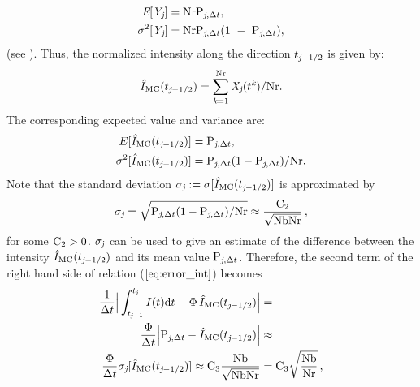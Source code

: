 \begin{subequations}
\begin{align}
\textit{E}[\textit{Y}_{\textit{j}}] &= \textrm{Nr}\textrm{P}_{\textit{j}, \Delta t}, \\ \sigma^2[\textit{Y}_{\textit{j}}] &= \textrm{Nr}\textrm{P}_{\textit{j}, \Delta t}(1~-~\textrm{P}_{\textit{j}, \Delta t}),\end{align}
\end{subequations}
(see \cite{zolotarev1997modern, rubinstein2016simulation}).
Thus, the normalized intensity along the direction $t_{\textit{j}-1/2}$ is given by:
\begin{equation}\hat{I}_{\textrm{MC}}(t_{\textit{j}-1/2}) = \sum_{\textit{k}=1}^{\textrm{Nr}}\textit{X}_{\textit{j}}(t^{\textit{k}})/\textrm{Nr}.\end{equation}
The corresponding expected value and variance are:
\begin{subequations}
\begin{align}E[\hat{I}_{\textrm{MC}}(t_{\textit{j}-1/2})]&=\textrm{P}_{\textit{j}, \Delta t},\\ \label{eq:variance_I}
\sigma^2[\hat{I}_{\textrm{MC}}(t_{\textit{j}-1/2})] &= \textrm{P}_{\textit{j}, \Delta t}(1-\textrm{P}_{\textit{j}, \Delta t})/\textrm{Nr}.
\end{align}
\end{subequations}
Note that the standard deviation $\sigma_{\textit{j}}:=\sigma[\hat{I}_{\textrm{MC}}(t_{\textit{j}-1/2})]$ is approximated by
\begin{equation}\label{sigma}
\sigma_{\textit{j}}= \sqrt{\textrm{P}_{\textit{j}, \Delta t}(1-\textrm{P}_{\textit{j}, \Delta t})/\textrm{Nr}}\approx \frac{\textrm{C}_2}{\sqrt{\textrm{Nb}\textrm{Nr}}}\,, \end{equation}
 for some $\textrm{C}_{2}>0$. $\sigma_{\textit{j}}$ can be used to give an estimate of the difference between the intensity $\hat{I}_{\textrm{MC}}(t_{\textit{j}-1/2})$ and its mean value $\textrm{P}_{\textit{j}, \Delta t}$.
Therefore, the second term of the right hand side of relation ($\ref{eq:error_int}$) becomes
\begin{equation}\begin{aligned}
\frac{1}{\Delta t}\Big|\int_{t_{\textit{j}-1}}^{t_{\textit{j}}} I(t)\textrm{d}t -
\Phi\, \hat{I}_{\textrm{MC}}(t_{\textit{j}-1/2})\Big| &=  \\
\frac{\Phi}{\Delta t}\Big|\textrm{P}_{\textit{j}, \Delta t} -\hat{I}_{\textrm{MC}}(t_{\textit{j}-1/2})\Big| &\approx  \\
  \frac{\Phi}{\Delta t}
\sigma_{\textit{j}}[\hat{I}_{\textrm{MC}}(t_{\textit{j}-1/2})]\approx\textrm{C}_3\frac{\textrm{Nb}}{\sqrt{\textrm{Nb}\textrm{Nr}}} & = \textrm{C}_3\sqrt{\frac{\textrm{Nb}}{\textrm{Nr}}}\,,
\end{aligned}
\end{equation}
